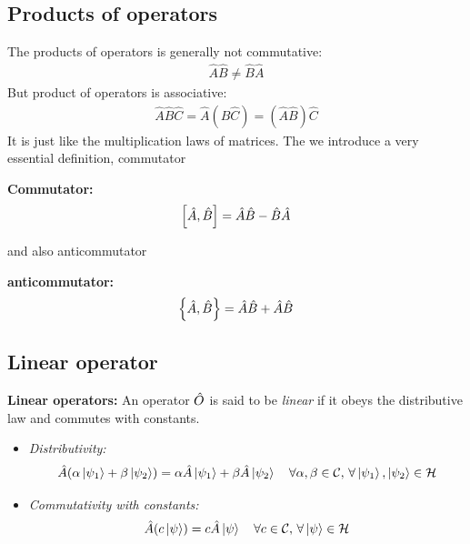 \subsection{Products of operators}
The products of operators is generally not commutative:
\begin{eqnarray}
    \hat{A}\hat{B} \neq \hat{B}\hat{A}
\end{eqnarray}
But product of operators is associative: 
\begin{eqnarray}
    \hat{A}\hat{B}\hat{C} = \hat{A} \left(\hat{B}\hat{C}\right) = \left(\hat{A}\hat{B}\right)\hat{C}
\end{eqnarray}
It is just like the multiplication laws of matrices. The we introduce a very essential definition, commutator
\begin{definition}{\textbf{Commutator:}}
    \begin{eqnarray}
        \left[ \hat A , \hat B \right] = \hat{A} \hat{B} - \hat{B} \hat{A}
    \end{eqnarray}
\end{definition}

and also anticommutator

\begin{definition}{\textbf{anticommutator:}}
    \begin{eqnarray}
        \left\{ \hat A , \hat B \right\} = \hat{A} \hat{B} + \hat{A} \hat{B}
    \end{eqnarray}
\end{definition}
\subsection{Linear operator}
\begin{definition}{\textbf{Linear operators:}}
    An operator $\hat{O}$ is said to be \emph{linear} if it obeys the distributive law and commutes with constants. 
    \begin{itemize}
        \item \emph{Distributivity:} \begin{align}
            \hat{A} (\alpha \ket{\psi_1} + \beta \ket{\psi_2}) = \alpha \hat{A} \ket{\psi_1} + \beta \hat{A} \ket{\psi_2} \quad \forall \alpha,\beta \in \mathcal{C},\,\forall \ket{\psi_1},\ket{\psi_2} \in \mathcal{H}
        \end{align}
        \item \emph{Commutativity with constants:} \begin{eqnarray}
            \hat{A} (c \ket{\psi}) = c \hat{A} \ket{\psi} \quad \forall c \in \mathcal{C},\,\forall \ket{\psi} \in \mathcal{H}
            \end{eqnarray}
    \end{itemize}
\end{definition}

